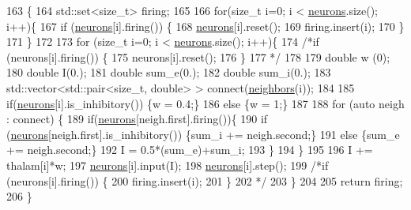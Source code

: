 \begin{DoxyCode}
163 \{
164     std::set<size\_t> firing;
165     
166     \textcolor{keywordflow}{for}(\textcolor{keywordtype}{size\_t} i=0; i < \hyperlink{classNetwork_a1b7832bc2c7b8855cdc3b2d6329eff9d}{neurons}.size(); i++)\{
167         \textcolor{keywordflow}{if} (\hyperlink{classNetwork_a1b7832bc2c7b8855cdc3b2d6329eff9d}{neurons}[i].firing()) \{
168             \hyperlink{classNetwork_a1b7832bc2c7b8855cdc3b2d6329eff9d}{neurons}[i].reset();
169             firing.insert(i);
170             \}
171         \}
172     
173     \textcolor{keywordflow}{for} (\textcolor{keywordtype}{size\_t} i=0; i < \hyperlink{classNetwork_a1b7832bc2c7b8855cdc3b2d6329eff9d}{neurons}.size(); i++)\{
174         \textcolor{comment}{/*if (neurons[i].firing()) \{}
175 \textcolor{comment}{            neurons[i].reset();}
176 \textcolor{comment}{            \}}
177 \textcolor{comment}{            */}
178             
179         \textcolor{keywordtype}{double} w (0);
180         \textcolor{keywordtype}{double} I(0.);
181         \textcolor{keywordtype}{double} sum\_e(0.);
182         \textcolor{keywordtype}{double} sum\_i(0.);
183         std::vector<std::pair<size\_t, double> > connect(\hyperlink{classNetwork_abf7324fe99e691cb9b06247e5e5013fd}{neighbors}(i));
184         
185         \textcolor{keywordflow}{if}(\hyperlink{classNetwork_a1b7832bc2c7b8855cdc3b2d6329eff9d}{neurons}[i].is\_inhibitory()) \{w = 0.4;\}
186         \textcolor{keywordflow}{else} \{w = 1;\}
187         
188         \textcolor{keywordflow}{for} (\textcolor{keyword}{auto} neigh : connect) \{    
189             \textcolor{keywordflow}{if}(\hyperlink{classNetwork_a1b7832bc2c7b8855cdc3b2d6329eff9d}{neurons}[neigh.first].firing())\{ 
190                 \textcolor{keywordflow}{if} (\hyperlink{classNetwork_a1b7832bc2c7b8855cdc3b2d6329eff9d}{neurons}[neigh.first].is\_inhibitory()) \{sum\_i += neigh.second;\}
191                 \textcolor{keywordflow}{else} \{sum\_e += neigh.second;\}
192                 I = 0.5*(sum\_e)+sum\_i;
193             \}
194         \}
195 
196         I += thalam[i]*w;
197         \hyperlink{classNetwork_a1b7832bc2c7b8855cdc3b2d6329eff9d}{neurons}[i].input(I);
198         \hyperlink{classNetwork_a1b7832bc2c7b8855cdc3b2d6329eff9d}{neurons}[i].step();
199         \textcolor{comment}{/*if (neurons[i].firing()) \{}
200 \textcolor{comment}{            firing.insert(i);}
201 \textcolor{comment}{                        \}}
202 \textcolor{comment}{                        */}
203     \}
204         
205     \textcolor{keywordflow}{return} firing;
206 \}
\end{DoxyCode}


